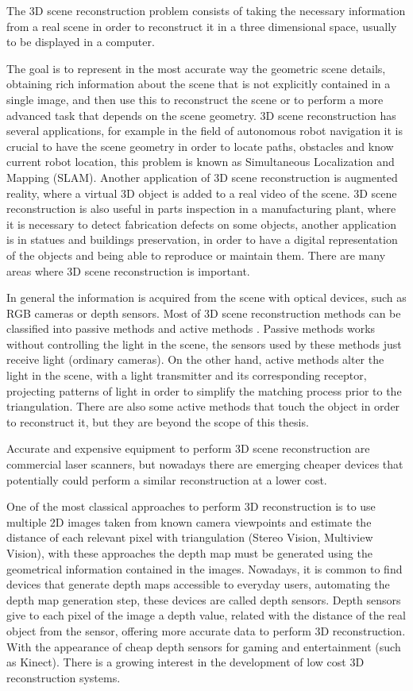 \indent The 3D scene reconstruction problem consists of taking the
necessary information from a real scene in order to reconstruct
it in a three dimensional space, usually to be displayed 
in a computer. 

The goal is to represent in the most accurate way the geometric scene details, obtaining rich 
information about the scene that is not explicitly contained in a single image, and then use this 
to reconstruct the scene or to perform a more advanced task that depends on the scene geometry. 
3D scene reconstruction has several applications, for example in the field of autonomous robot navigation it is crucial to have 
the scene geometry in order to locate paths, obstacles and know current robot location, this problem is known as 
Simultaneous Localization and Mapping (SLAM). Another application of 3D scene reconstruction is augmented reality, 
where a virtual 3D object is added to a real video of the scene. 3D scene reconstruction is also useful in parts inspection 
in a manufacturing plant, where it is necessary to detect
 fabrication defects on some objects, another application is in statues and buildings preservation, in order to have a digital representation 
of the objects and being able to reproduce or maintain them. There are many areas where 3D scene reconstruction is important.

 
In general the information is acquired
 from the scene with optical devices, such as RGB cameras or depth sensors.
Most of 3D scene reconstruction methods can be classified into passive methods and active methods \cite{lanman}.
Passive methods works without controlling the light in the scene, the sensors used by these methods just receive light (ordinary cameras). 
On the other hand, active methods alter the light in the scene, with a light transmitter and its corresponding 
receptor, projecting patterns of light in order to simplify the matching process prior to the triangulation. 
There are also some active methods that touch the object in order to reconstruct it, but they are beyond 
the scope of this thesis. 

Accurate and expensive equipment to perform 3D scene reconstruction are commercial laser scanners,
 but nowadays there are emerging cheaper devices that 
potentially could perform 
a similar reconstruction at a lower cost.

One of the most classical approaches to perform 3D reconstruction is to use multiple 2D
 images taken from known camera viewpoints and estimate the distance of each
 relevant pixel with triangulation (Stereo Vision, Multiview Vision), with these 
approaches the depth map must be generated using the geometrical information contained
 in the images. Nowadays, it is common to find devices that generate depth maps accessible
 to everyday users, automating the depth map generation step, these devices are called depth sensors. 
Depth sensors give to each pixel of the image a depth value, related
with the distance of the real object from the sensor, offering  more
accurate data to perform 3D reconstruction. With the appearance
of cheap depth sensors for gaming and entertainment (such as
Kinect). There is a growing interest in the development of low cost
3D reconstruction systems. 


